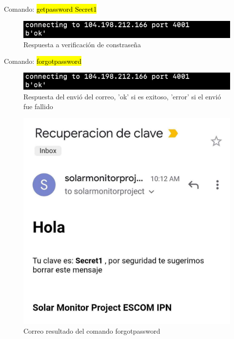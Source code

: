 Comando: \hl{getpassword Secret1}
\begin{figure}[H]
	\centering
	\includegraphics[scale=.5]{Capitulo5/images/forgot_pass.png}
	\caption{Respuesta a verificación de constraseña}
	\label{fig:}
\end{figure} 

Comando: \hl{forgotpassword}
\begin{figure}[H]
	\centering
	\includegraphics[scale=.5]{Capitulo5/images/forgot_pass.png}
	\caption{Respuesta del envió del correo, 'ok' si es exitoso, 'error' si el envió fue fallido}
	\label{fig:}
\end{figure} 

\begin{figure}[H]
	\centering
	\includegraphics[scale=.2]{Capitulo5/images/correo.jpg}
	\caption{Correo resultado del comando forgotpassword}
	\label{fig:}
\end{figure}

